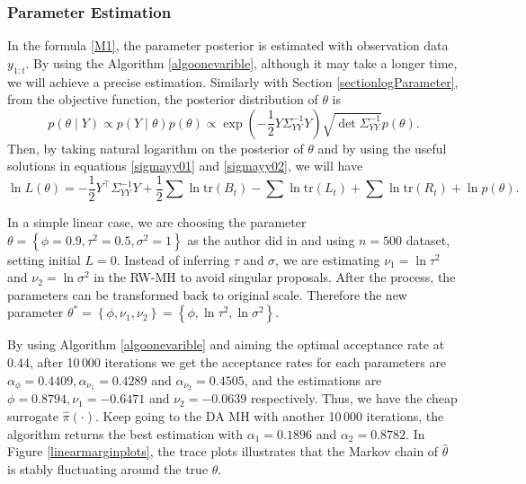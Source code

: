 \subsubsection*{Parameter Estimation}

In the formula \eqref{M1}, the parameter posterior is estimated with observation data $y_{1:t}$. By using the Algorithm \ref{algoonevarible}, although it may take a longer time, we will achieve a precise estimation. Similarly with Section \ref{sectionlogParameter}, from the objective function, the posterior distribution of $\theta$ is 
\begin{equation*}
p(\theta \mid Y) \propto p(Y\mid\theta)p(\theta) \propto \exp\left( {-\frac{1}{2} Y \Sigma_{YY}^{-1} Y } \right) \sqrt{\det \Sigma_{YY}^{-1}} p(\theta).
\end{equation*}
Then, by taking natural logarithm on the posterior of $\theta$ and by using the useful solutions in equations \eqref{sigmayy01} and \eqref{sigmayy02}, we will have
\begin{equation}\label{linearlogL}
\ln L(\theta) = -\frac{1}{2}Y^\top\Sigma_{YY}^{-1}Y+\frac{1}{2}\sum\ln\mbox{tr}(B_t)-\sum\ln\mbox{tr}(L_t)+\sum\ln\mbox{tr}(R_t) + \ln p(\theta).
\end{equation}

In a simple linear case, we are choosing the parameter $\theta = \left\lbrace \phi=0.9,\tau^2=0.5,\sigma^2=1\right\rbrace$ as the author did in \citep{lopes2011particle} and using $n=500$ dataset, setting initial $L=0$. Instead of inferring $\tau$ and $\sigma$, we are estimating $\nu_1 = \ln \tau^2$ and $\nu_2 = \ln \sigma^2$ in the RW-MH to avoid singular proposals. After the process, the parameters can be transformed back to original scale. Therefore the new parameter  $\theta^* =  \left\lbrace \phi,\nu_1,\nu_2\right\rbrace = \left\lbrace \phi,\ln\tau^2,\ln\sigma^2\right\rbrace$. 

By using Algorithm \ref{algoonevarible} and aiming the optimal acceptance rate at 0.44, after 10\,000 iterations we get the acceptance rates for each parameters are $\alpha_\phi = 0.4409, \alpha_{\nu_1}= 0.4289$ and $\alpha_{\nu_2}= 0.4505$, and the estimations are $\phi =0.8794, \nu_1= -0.6471$ and $\nu_2= -0.0639$ respectively. Thus, we have the cheap surrogate $\hat{\pi}(\cdot)$. Keep going to the DA MH with another 10\,000 iterations, the algorithm returns the best estimation with $\alpha_1=0.1896$ and $\alpha_2 = 0.8782$. In Figure \ref{linearmarginplots}, the trace plots illustrates that the Markov chain of $\hat{\theta}$ is stably fluctuating around the true $\theta$. 

